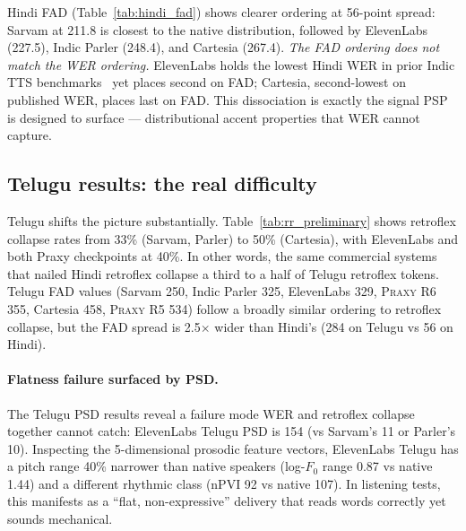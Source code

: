 \documentclass[conference,a4paper]{IEEEtran}
\newcommand{\psp}{\textsc{PSP}}
\newcommand{\praxy}{\textsc{Praxy}}
\begin{document}
Hindi FAD (Table~\ref{tab:hindi_fad}) shows clearer ordering at 56-point spread: Sarvam at 211.8 is closest to the native distribution, followed by ElevenLabs (227.5), Indic Parler (248.4), and Cartesia (267.4). \emph{The FAD ordering does not match the WER ordering.} ElevenLabs holds the lowest Hindi WER in prior Indic TTS benchmarks~\cite{kumar2022indictts} yet places second on FAD; Cartesia, second-lowest on published WER, places last on FAD. This dissociation is exactly the signal \psp{} is designed to surface --- distributional accent properties that WER cannot capture.

\subsection{Telugu results: the real difficulty}

Telugu shifts the picture substantially. Table~\ref{tab:rr_preliminary} shows retroflex collapse rates from 33\% (Sarvam, Parler) to 50\% (Cartesia), with ElevenLabs and both Praxy checkpoints at 40\%. In other words, the same commercial systems that nailed Hindi retroflex collapse a third to a half of Telugu retroflex tokens. Telugu FAD values (Sarvam 250, Indic Parler 325, ElevenLabs 329, \praxy{} R6 355, Cartesia 458, \praxy{} R5 534) follow a broadly similar ordering to retroflex collapse, but the FAD spread is 2.5$\times$ wider than Hindi's (284 on Telugu vs 56 on Hindi).

\paragraph{Flatness failure surfaced by PSD.} The Telugu PSD results reveal a failure mode WER and retroflex collapse together cannot catch: ElevenLabs Telugu PSD is 154 (vs Sarvam's 11 or Parler's 10). Inspecting the 5-dimensional prosodic feature vectors, ElevenLabs Telugu has a pitch range 40\% narrower than native speakers (log-$F_0$ range 0.87 vs native 1.44) and a different rhythmic class (nPVI 92 vs native 107). In listening tests, this manifests as a ``flat, non-expressive'' delivery that reads words correctly yet sounds mechanical.
\end{document}
